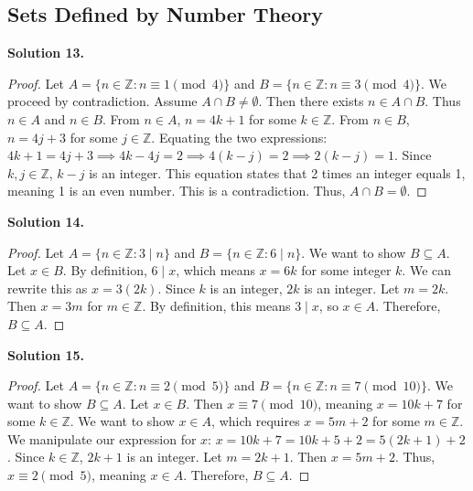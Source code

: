 \documentclass[11pt]{article}
\begin{document}
\subsection{Sets Defined by Number Theory}

\noindent \textbf{Solution 13.}
\begin{proof}
Let $A = \{n \in \mathbb{Z} : n \equiv 1 \pmod 4\}$ and $B = \{n \in \mathbb{Z} : n \equiv 3 \pmod 4\}$. We proceed by contradiction. Assume $A \cap B \neq \emptyset$. Then there exists $n \in A \cap B$. Thus $n \in A$ and $n \in B$. 
From $n \in A$, $n = 4k + 1$ for some $k \in \mathbb{Z}$. 
From $n \in B$, $n = 4j + 3$ for some $j \in \mathbb{Z}$. 
Equating the two expressions: $4k + 1 = 4j + 3 \implies 4k - 4j = 2 \implies 4(k - j) = 2 \implies 2(k - j) = 1$. 
Since $k, j \in \mathbb{Z}$, $k - j$ is an integer. This equation states that 2 times an integer equals 1, meaning 1 is an even number. This is a contradiction. Thus, $A \cap B = \emptyset$.
\end{proof}

\noindent \textbf{Solution 14.}
\begin{proof}
Let $A = \{n \in \mathbb{Z} : 3 \mid n\}$ and $B = \{n \in \mathbb{Z} : 6 \mid n\}$. We want to show $B \subseteq A$. Let $x \in B$. By definition, $6 \mid x$, which means $x = 6k$ for some integer $k$. We can rewrite this as $x = 3(2k)$. Since $k$ is an integer, $2k$ is an integer. Let $m = 2k$. Then $x = 3m$ for $m \in \mathbb{Z}$. By definition, this means $3 \mid x$, so $x \in A$. Therefore, $B \subseteq A$.
\end{proof}

\noindent \textbf{Solution 15.}
\begin{proof}
Let $A = \{n \in \mathbb{Z} : n \equiv 2 \pmod 5\}$ and $B = \{n \in \mathbb{Z} : n \equiv 7 \pmod{10}\}$. We want to show $B \subseteq A$. Let $x \in B$. Then $x \equiv 7 \pmod{10}$, meaning $x = 10k + 7$ for some $k \in \mathbb{Z}$. We want to show $x \in A$, which requires $x = 5m + 2$ for some $m \in \mathbb{Z}$. 
We manipulate our expression for $x$: $x = 10k + 7 = 10k + 5 + 2 = 5(2k + 1) + 2$. 
Since $k \in \mathbb{Z}$, $2k + 1$ is an integer. Let $m = 2k + 1$. Then $x = 5m + 2$. Thus, $x \equiv 2 \pmod 5$, meaning $x \in A$. Therefore, $B \subseteq A$.
\end{proof}
\end{document}
